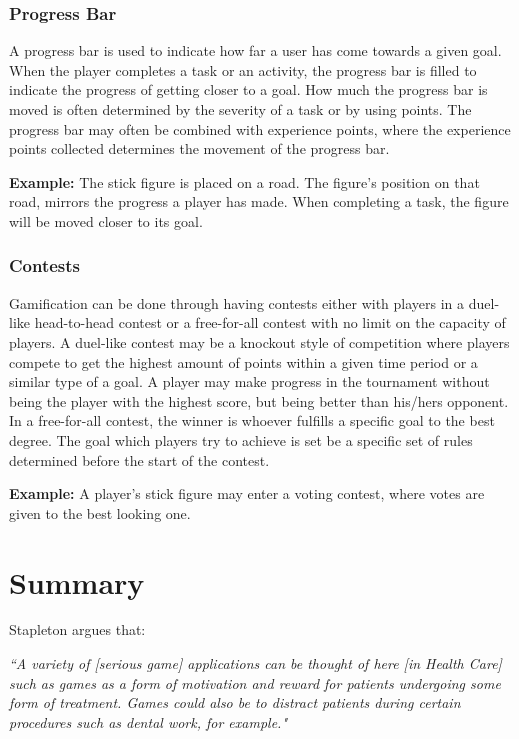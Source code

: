 \subsubsection{Progress Bar}
\label{sec:progressbar}
A progress bar is used to indicate how far a user has come towards a given goal. When the player completes a task or an activity, the progress bar is filled to indicate the progress of getting closer to a goal. How much the progress bar is moved is often determined by the severity of a task or by using points. The progress bar may often be combined with experience points, where the experience points collected determines the movement of the progress bar. 

\textbf{Example:} The stick figure is placed on a road. The figure's position on that road, mirrors the progress a player has made. When completing a task, the figure will be moved closer to its goal.  


\subsubsection{Contests}
\label{sec:contests}
Gamification can be done through having contests either with players in a duel-like head-to-head contest or a free-for-all contest with no limit on the capacity of players. A duel-like contest may be a knockout style of competition where players compete to get the highest amount of points within a given time period or a similar type of a goal. A player may make progress in the tournament without being the player with the highest score, but being better than his/hers opponent. In a free-for-all contest, the winner is whoever fulfills a specific goal to the best degree. The goal which players try to achieve is set be a specific set of rules determined before the start of the contest.

\textbf{Example:} A player's stick figure may enter a voting contest, where votes are given to the best looking one.


\section{Summary}
\label{sec:gamificationinapp}

Stapleton argues that:

\textit{``A variety of [serious game] applications can be thought of here [in Health Care] such as games as a form of motivation and reward for patients undergoing some form of treatment. Games could also be to distract patients during certain procedures such as dental work, for example."}\cite{stapleton2004serious}

